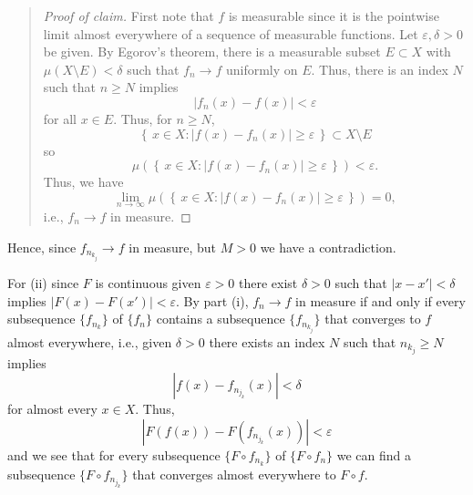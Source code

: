 \begin{solution}
\begin{quote}
\begin{proof}[Proof of claim]
    First note that $f$ is measurable since it is the pointwise limit
    almost everywhere of a sequence of measurable functions. Let
    $\varepsilon,\delta>0$ be given.  By Egorov's theorem, there is a
    measurable subset $E\subset X$ with $\mu(X\setminus E)<\delta$ such
    that $f_n\to f$ uniformly on $E$. Thus, there is an index $N$ such that
    $n\geq N$ implies
    \[
      |f_n(x)-f(x)|<\varepsilon
    \]
    for all $x\in E$. Thus, for $n\geq N$,
    \[
      \left\{\,x\in X:|f(x)-f_n(x)|\geq\varepsilon\,\right\}\subset
      X\setminus E
    \]
    so
    \[
      \mu\left(%
        \left\{\,x\in X:|f(x)-f_n(x)|\geq\varepsilon\,\right\}%
      \right)%
      <\varepsilon.
    \]
    Thus, we have
    \[
      \lim_{n\to\infty}\mu\left(%
        \left\{\,x\in X:|f(x)-f_n(x)|\geq\varepsilon\,\right\}%
      \right)%
      =0,
    \]
    i.e., $f_n\to f$ in measure.
  \end{proof}
  \end{quote}
  Hence, since $f_{n_{k_j}}\to f$ in measure, but $M>0$ we have a
  contradiction.

  For (ii) since $F$ is continuous given $\varepsilon>0$ there exist
  $\delta>0$ such that $|x-x'|<\delta$ implies
  $|F(x)-F(x')|<\varepsilon$. By part (i), $f_n\to f$ in measure if and
  only if every subsequence $\{f_{n_k}\}$ of $\{f_n\}$ contains a
  subsequence $\{f_{n_{k_j}}\}$ that converges to $f$ almost everywhere,
  i.e., given $\delta>0$ there exists an index $N$ such that $n_{k_j}\geq
  N$ implies
  \[
    |f(x)-f_{n_{j_k}}(x)|<\delta
  \]
  for almost every $x\in X$. Thus,
  \[
    \left|F(f(x))-F(f_{n_{j_k}}(x))\right|<\varepsilon
  \]
  and we see that for every subsequence $\{F\circ f_{n_k}\}$ of $\{F\circ
  f_n\}$ we can find a subsequence $\{F\circ f_{n_{j_k}}\}$ that converges
  almost everywhere to $F\circ f$.
\end{solution}

